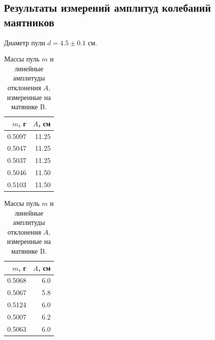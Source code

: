 \documentclass[12pt]{article}
\begin{document}
\subsection{Результаты измерений амплитуд колебаний маятников} \label{app_2}
Диаметр пули $d = 4.5 \pm 0.1$ см.
\begin{table}[H]
    \centering
    \begin{tabular}{|r|r|}
        \hline
        $m$, г & $A$, см \\
        \hline
        0.5097 & 11.25   \\
        0.5047 & 11.25   \\
        0.5037 & 11.25   \\
        0.5046 & 11.50   \\
        0.5103 & 11.50   \\
        \hline
    \end{tabular}
    \caption{Массы пуль $m$ и линейные амплитуды отклонения $A$, измеренные на матянике B.}
    \label{tab:3}
\end{table}

\begin{table}[H]
    \centering
    \begin{tabular}{|r|r|}
        \hline
        $m$, г & $A$, см \\
        \hline
        0.5068 & 6.0     \\
        0.5067 & 5.8     \\
        0.5124 & 6.0     \\
        0.5007 & 6.2     \\
        0.5063 & 6.0     \\
        \hline
    \end{tabular}
    \caption{Массы пуль $m$ и линейные амплитуды отклонения $A$, измеренные на матянике B.}
    \label{tab:4}
\end{table}
\end{document}
